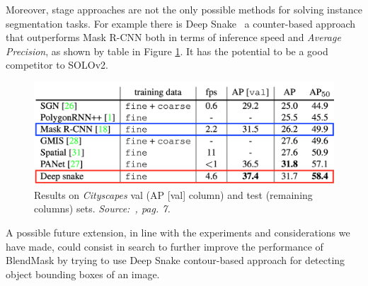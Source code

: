 \documentclass[10pt,twocolumn,letterpaper]{article}
\begin{document}
Moreover, stage approaches are not the only possible methods for solving instance segmentation tasks.
For example there is Deep Snake~\cite{Authors7_deepsnake} a counter-based approach that outperforms Mask R-CNN both in terms of inference speed and \textit{Average Precision}, as shown by table in Figure \ref{fig:conclusiondeepsnake}. It has the potential to be a good competitor to SOLOv2.
\begin{figure}[H]
\centering
  \includegraphics[width=0.92\linewidth]{./image/conclusion_deepsnake.png}
  \caption{Results on \textit{Cityscapes} val (AP [val] column) and test (remaining columns) sets. \textit{Source:~\cite{Authors7_deepsnake}, pag. 7.}}
  \label{fig:conclusiondeepsnake}
\noindent
\end{figure}
A possible future extension, in line with the experiments and considerations we have made, could consist in search to further improve the performance of BlendMask by trying to use Deep Snake contour-based approach for detecting object bounding boxes of an image.
\end{document}
